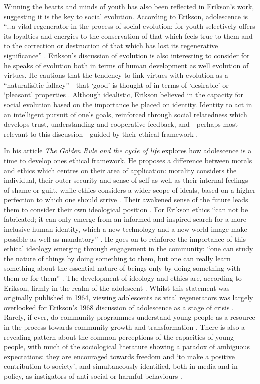 Winning the hearts and minds of youth has also been reflected in Erikson’s work, suggesting it is the key to social evolution. %
According to Erikson, adolescence is “...a vital regenerator in the process of social evolution; for youth selectively offers its loyalties and energies to the conservation of that which feels true to them and to the correction or destruction of that which has lost its regenerative significance” \citep[][p126]{Erikson1994}. Erikson's discussion of evolution is also interesting to consider for he speaks of evolution both in terms of human development as well evolution of virtues. He cautions that the tendency to link virtues with evolution as a “naturalisitic fallacy” - that `good' is thought of in terms of `desirable' or `pleasant' properties \citep[][p141-2]{Erikson1994}. Although idealistic, Erikson believed in the capacity for social evolution based on the importance he placed on identity. Identity to act in an intelligent pursuit of one’s goals, reinforced through social relatedness which develops trust, understanding and cooperative feedback, and - perhaps most relevant to this discussion - guided by their ethical framework \citep{Youniss1997b}. 


In his article \textit{The Golden Rule and the cycle of life} explores how adolescence is a time to develop ones ethical framework. He proposes a difference between morals and ethics which centres on their area of application: morality considers the individual, their outer security and sense of self as well as their internal feelings of shame or guilt, while ethics considers a wider scope of ideals, based on a higher perfection to which one should strive \citep{Erikson1963}. Their awakened sense of the future leads them to consider their own ideological position \citep{Erikson1963}. For Erikson ethics “can not be fabricated; it can only emerge from an informed and inspired search for a more inclusive human identity, which a new technology and a new world image make possible as well as mandatory” \citep[][p418]{Erikson1963}. He goes on to reinforce the importance of this ethical ideology emerging through engagement in the community: “one can study the nature of things by doing something to them, but one can really learn something about the essential nature of beings only by doing something with them or for them” \citep[][p420]{Erikson1963}. The development of ideology and ethics are, according to Erikson, firmly in the realm of the adolescent \citep{Erikson1963}. Whilst this statement was originally published in 1964, viewing adolescents as vital regenerators was largely overlooked for Erikson’s 1968 discussion of adolescence as a stage of crisis \citep{Erikson1968}. Rarely, if ever, do community programmes understand young people as a resource in the process towards community growth and transformation \citep[][p105]{White2008}. There is also a revealing pattern about the common perceptions of the capacities of young people, with much of the sociological literature showing a paradox of ambiguous expectations: they are encouraged towards freedom and ‘to make a positive contribution to society’, and simultaneously identified, both in media and in policy, as instigators of anti-social or harmful behaviours \citep{Ellis2009,Wyn2011}. 


